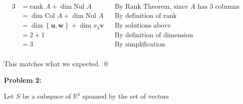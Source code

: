 \documentclass[10pt,letterpaper,final]{report}
\newcommand{\reason}[1]{&& \text{#1}}
\begin{document}
\begin{enumerate}[label=(\alph*)]
        \begin{align*}
          3 & = \text{rank } A + \dim \text{Nul } A                               \reason{By Rank Theorem, since $A$ has 3 columns} \\
            & = \dim \text{Col } A + \dim \text{Nul } A                           \reason{By definition of rank}                    \\
            & = \dim \left\{\mathbf{u}, \mathbf{w}\right\} + \dim {x}_3\mathbf{v} \reason{By solutions above}                       \\
            & = 2 + 1                                                             \reason{By definition of dimension}               \\
            & = 3                                                                 \reason{By simplification}                        \\
        \end{align*}

        This matches what we expected. \qed
\end{enumerate}

\pagebreak

\noindent\textbf{Problem 2:}
\medskip

Let $S$ be a subspace of $\mathbb{R}^4$ spanned by the set of vectors
\end{document}
